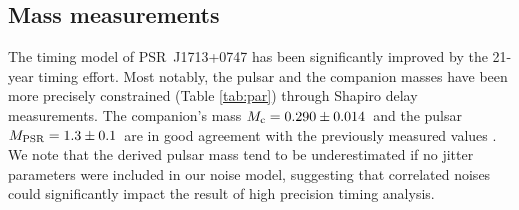 {%




}


\subsection{Mass measurements}
\label{sec:mass}
The timing model of PSR~J1713+0747 has been significantly improved by the 21-year timing effort.
Most notably, the pulsar and the companion masses have been more precisely
constrained (Table \ref{tab:par}) through Shapiro delay measurements. The
companion's mass $M_{\rm c} = 0.290\pm0.014$~\Msun and the pulsar $M_{\rm
PSR}=1.3\pm0.1$~\Msun are in good agreement with the previously measured values \cite{sns+05}.
We note that the derived pulsar mass tend to be underestimated 
if no jitter parameters were included in our noise model, suggesting that
correlated noises could significantly impact the result of high
precision timing analysis.


